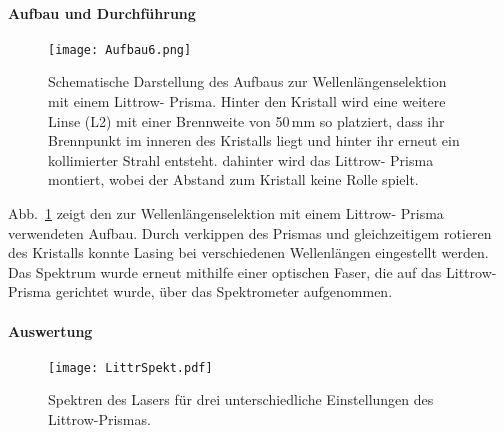 \paragraph{Aufbau und Durchführung}

\begin{figure}[H]
\begin{center}
  \texttt{[image: Aufbau6.png]}
  \caption{Schematische Darstellung des Aufbaus zur Wellenlängenselektion mit einem Littrow- Prisma. Hinter den Kristall wird eine weitere Linse (L2) mit einer Brennweite von 50\,mm so platziert, dass ihr Brennpunkt im inneren des Kristalls liegt und hinter ihr erneut ein kollimierter Strahl entsteht. dahinter wird das Littrow- Prisma montiert, wobei der Abstand zum Kristall keine Rolle spielt.}
  \label{img:aufbau6}
\end{center}
\end{figure}

Abb.~\ref{img:aufbau6} zeigt den zur Wellenlängenselektion mit einem Littrow- Prisma verwendeten Aufbau. Durch verkippen des Prismas und gleichzeitigem rotieren des Kristalls konnte Lasing bei verschiedenen Wellenlängen eingestellt werden. Das Spektrum wurde erneut mithilfe einer optischen Faser, die auf das Littrow- Prisma gerichtet wurde, über das Spektrometer aufgenommen.



\paragraph{Auswertung}



\begin{figure}[H]
\begin{center}
  \texttt{[image: LittrSpekt.pdf]}
  \caption{Spektren des Lasers für drei unterschiedliche Einstellungen des Littrow-Prismas.}
  \label{img:LittrSpekt}
\end{center}
\end{figure}
